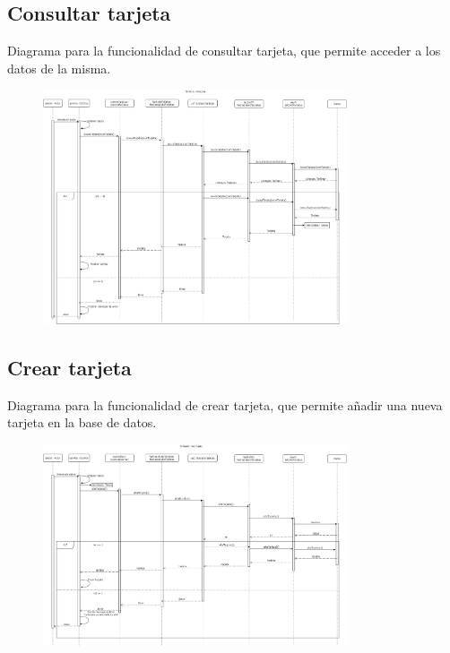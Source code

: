 \documentclass[12pt]{article}
\begin{document}
\subsection{Consultar tarjeta}
Diagrama para la funcionalidad de consultar tarjeta, que permite acceder a los datos de la misma.
\begin{figure}[H]
    \centering
    \includegraphics[width=0.8\textwidth]{images/consultarTarjeta.png}
\end{figure}
\subsection{Crear tarjeta}
Diagrama para la funcionalidad de crear tarjeta, que permite añadir una nueva tarjeta en la base de datos.
\begin{figure}[H]
    \centering
    \includegraphics[width=0.8\textwidth]{images/14-Gestor_crea_tarjeta.png}
\end{figure}
\newpage
\end{document}
